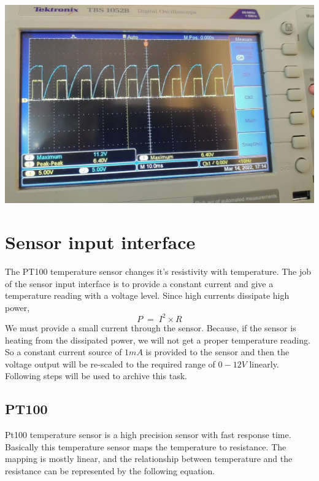 \begin{multicols}{2}
\begin{minipage}{0.45\textwidth}
\centering
\includegraphics[width=\textwidth]{ramp 2.jpg}
\end{minipage}

\section{Sensor input interface}
The PT100 temperature sensor changes it's resistivity with temperature. The job of the sensor input interface is to provide a constant current and give a temperature reading with a voltage level. Since high currents dissipate high power,
$$P \; = \; I^2 \times R$$
We must provide a small current through the sensor. Because, if the sensor is heating from the dissipated power, we will not get a proper temperature reading. So a constant current source of $1mA$ is provided to the sensor and then the voltage output will be re-scaled to the required range of $0-12V$ linearly. Following steps will be used to archive this task.

\subsection{PT100}
Pt100 temperature sensor is a high precision sensor with fast response time. Basically this temperature sensor maps the temperature to resistance. The mapping is mostly linear, and the relationship between temperature and the resistance can be represented by the following equation.



\end{multicols}

